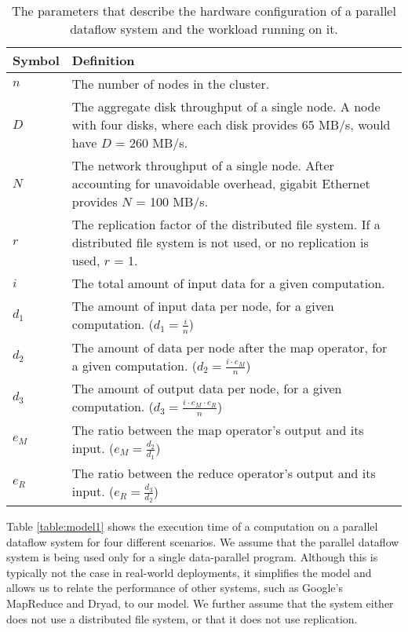 \documentclass{acm_proc_article-sp}
\begin{document}
\begin{table}
\centering
\begin{minipage}{0.5\textwidth}
\centering
\renewcommand{\arraystretch}{1.2}
\begin{tabular}{|l|p{6.5cm}|}
\hline
Symbol & Definition \\ \hline
$n$    & The number of nodes in the cluster. \\ \hline
$D$    & The aggregate disk throughput of a single node. A node with four disks, where each disk provides 65 MB/s, would have $D$ = 260 MB/s. \\ \hline
$N$    & The network throughput of a single node. After accounting for unavoidable overhead, gigabit Ethernet provides $N$ = 100 MB/s. \\ \hline
$r$    & The replication factor of the distributed file system. If a distributed file system is not used, or no replication is used, $r$ = 1. \\ \hline
$i$    & The total amount of input data for a given computation. \\ \hline
$d_1$  & The amount of input data per node, for a given computation. ($d_1 = \frac{i}{n}$) \\ \hline
$d_2$  & The amount of data per node after the map operator, for a given computation. ($d_2 = \frac{i \cdot e_M}{n}$) \\ \hline
$d_3$  & The amount of output data per node, for a given computation. ($d_3 = \frac{i \cdot e_M \cdot e_R}{n}$) \\ \hline
$e_M$  & The ratio between the map operator's output and its input. ($e_M = \frac{d_2}{d_1}$) \\ \hline
$e_R$  & The ratio between the reduce operator's output and its input. ($e_R = \frac{d_3}{d_2}$) \\ \hline

\end{tabular}
\caption{The parameters that describe the hardware configuration of a parallel dataflow system and the workload running on it.}
\end{minipage}
\label{table:symbols}
\end{table}

Table \ref{table:model1} shows the execution time of a computation on a parallel dataflow system for four different scenarios. We assume that the parallel dataflow system is being used only for a single data-parallel program. Although this is typically not the case in real-world deployments, it simplifies the model and allows us to relate the performance of other systems, such as Google's MapReduce and Dryad, to our model. We further assume that the system either does not use a distributed file system, or that it does not use replication.
\end{document}
